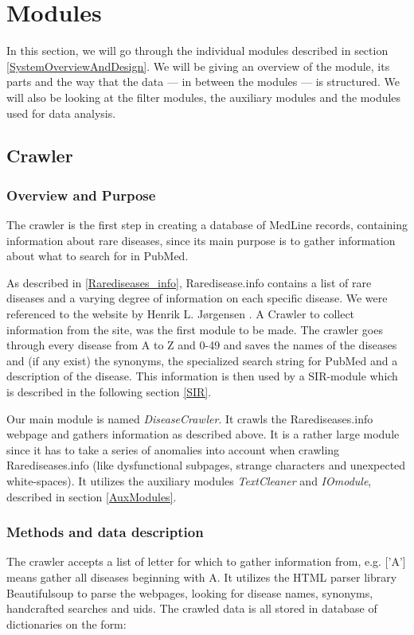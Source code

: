 \section{Modules}

In this section, we will go through the individual modules described
in section \ref{SystemOverviewAndDesign}. We will be giving an
overview of the module, its parts and the way that the data --- in
between the modules --- is structured. We will also be looking at the
filter modules, the auxiliary modules and the modules used for data
analysis.

\subsection{Crawler\label{Crawler}}

\subsubsection{Overview and Purpose}
The crawler is the first step in creating a database of MedLine
records, containing information about rare diseases, since its main
purpose is to gather information about what to search for in PubMed.

As described in \ref{Rarediseases_info}, Raredisease.info contains a
list of rare diseases and a varying degree of information on each
specific disease. We were referenced to the website by Henrik L.
J\o rgensen \cite{TheDude}. A Crawler to collect information from the
site, was the first module to be made. The crawler goes through every
disease from A to Z and 0-49 and saves the names of the diseases and
(if any exist) the synonyms, the specialized search string for PubMed
and a description of the disease. This information is then used by a
SIR-module which is described in the following section \ref{SIR}.

Our main module is named \textit{DiseaseCrawler}. It crawls the
Rarediseases.info webpage and gathers information as described
above. It is a rather large module since it has to take a series of
anomalies into account when crawling Rarediseases.info (like
dysfunctional subpages, strange characters and unexpected
white-spaces). It utilizes the auxiliary modules \textit{TextCleaner}
and \textit{IOmodule}, described in section \ref{AuxModules}.


\subsubsection{Methods and data description}
The crawler accepts a list of letter for which to gather information
from, e.g. ['A'] means gather all diseases beginning with A. It
utilizes the HTML parser library Beautifulsoup \cite{BS} to parse the
webpages, looking for disease names, synonyms, handcrafted searches
and uids. The crawled data is all stored in database of dictionaries
on the form:

